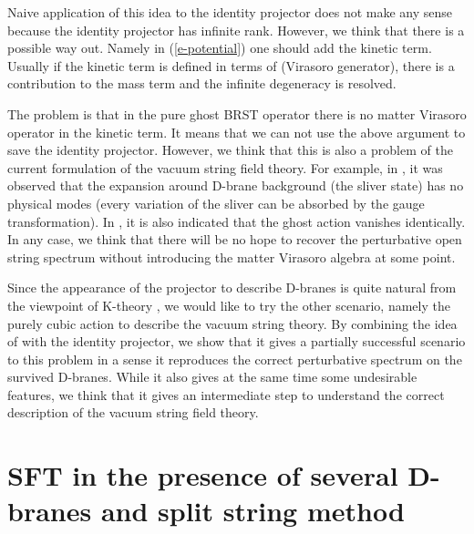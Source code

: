 \documentclass[a4paper,12pt]{article}
\begin{document}
Naive application of this idea to the identity projector
does not make any sense because the identity projector has
infinite rank.
However, we think that there is a possible
way out.  Namely in (\ref{e-potential}) one should add
the kinetic term.  Usually if the kinetic term is defined
in terms of \coordHE{} (Virasoro generator), there is a contribution
to the mass term and the infinite degeneracy is resolved.

The problem is that in the pure ghost BRST operator there is no
matter Virasoro operator in the kinetic term. It means that we
can not use the above argument to save the identity projector.
However, we think that this is also a problem of the current
formulation of the
vacuum string field theory.  For example, in \cite{r-RSZ4},
it was observed that the expansion around D-brane background
(the sliver state) has no physical modes (every variation of the sliver 
can be absorbed by the gauge transformation).  In \cite{r-GT2}, it is also
indicated that the ghost action vanishes identically.
In any case, we think that there will be no hope to recover
the perturbative open string spectrum without introducing 
the matter Virasoro algebra at some point.

Since the appearance of the projector to describe D-branes
is quite natural from the viewpoint of K-theory 
\cite{r-Witten3,r-Matsuo0,r-HM},
we would like to try the other scenario, namely the
purely cubic action to describe the vacuum string theory.
By combining the idea of \cite{r-HLRS} with the identity
projector, we show that it gives a partially successful scenario
to this problem in a sense it reproduces the correct
perturbative spectrum on the survived D-branes.  While it
also gives at the same time some undesirable features, 
we think that it gives an intermediate  step to 
understand the correct description of the vacuum string field theory.


\section{SFT in the presence of several D-branes and split string method}
\end{document}

